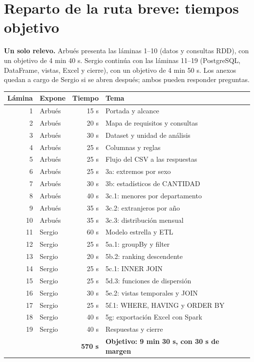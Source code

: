 \documentclass[10pt,a4paper]{article}
\begin{document}
\section*{Reparto de la ruta breve: tiempos objetivo}
\noindent\textbf{Un solo relevo.} Arbués presenta las láminas 1--10
(datos y consultas RDD), con un objetivo de 4 min 40 s. Sergio continúa con las láminas
11--19 (PostgreSQL, DataFrame, vistas, Excel y cierre), con un objetivo de 4 min 50 s.
Los anexos quedan a cargo de Sergio si se abren después; ambos pueden responder preguntas.
\medskip
{\small
\noindent\begin{tabularx}{\linewidth}{@{}rlrX@{}}
\toprule Lámina & Expone & Tiempo & Tema\\\midrule
1 & Arbués & 15 s & Portada y alcance\\
2 & Arbués & 20 s & Mapa de requisitos y consultas\\
3 & Arbués & 30 s & Dataset y unidad de análisis\\
4 & Arbués & 25 s & Columnas y reglas\\
5 & Arbués & 25 s & Flujo del CSV a las respuestas\\
6 & Arbués & 25 s & 3a: extremos por sexo\\
7 & Arbués & 30 s & 3b: estadísticos de CANTIDAD\\
8 & Arbués & 40 s & 3c.1: menores por departamento\\
9 & Arbués & 35 s & 3c.2: extranjeros por año\\
10 & Arbués & 35 s & 3c.3: distribución mensual\\
11 & Sergio & 60 s & Modelo estrella y ETL\\
12 & Sergio & 25 s & 5a.1: groupBy y filter\\
13 & Sergio & 20 s & 5b.2: ranking descendente\\
14 & Sergio & 25 s & 5c.1: INNER JOIN\\
15 & Sergio & 25 s & 5d.3: funciones de dispersión\\
16 & Sergio & 30 s & 5e.2: vistas temporales y JOIN\\
17 & Sergio & 25 s & 5f.1: WHERE, HAVING y ORDER BY\\
18 & Sergio & 40 s & 5g: exportación Excel con Spark\\
19 & Sergio & 40 s & Respuestas y cierre\\\midrule
 & & \textbf{570 s} & \textbf{Objetivo: 9 min 30 s, con 30 s de margen}\\\bottomrule
\end{tabularx}}
\end{document}
